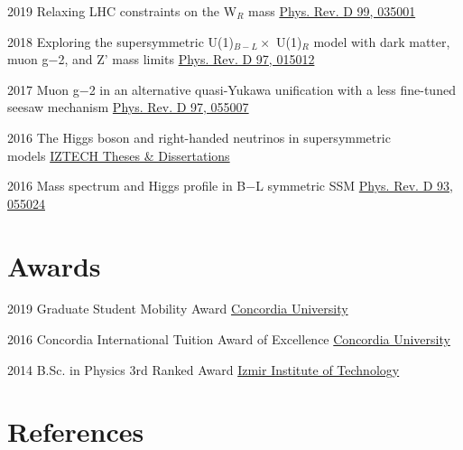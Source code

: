 \documentclass[]{friggeri-cv}
\begin{document}
\begin{entrylist}
	
	\entry
	{2019}
	{Relaxing LHC constraints on the W$_R$ mass}
	{\href{https://journals.aps.org/prd/abstract/10.1103/PhysRevD.99.035001}{Phys. Rev. D 99, 035001}} 
	
	
	\entry
	{2018}
	{Exploring the supersymmetric U(1)$_{B-L} \times$ U(1)$_R$ model with dark matter, muon g−2, and Z' mass limits}
	{\href{https://journals.aps.org/prd/abstract/10.1103/PhysRevD.97.015012}{Phys. Rev. D 97, 015012}} 
	
	\entry
	{2017}
	{Muon g−2 in an alternative quasi-Yukawa unification with a less fine-tuned seesaw mechanism}
	{\href{http://journals.aps.org/prd/abstract/10.1103/PhysRevD.97.055007}{Phys. Rev. D 97, 055007}} 
	
	\entry
	{2016}
	{The Higgs boson and right-handed neutrinos in supersymmetric \\ models}
	{\href{http://openaccess.iyte.edu.tr/xmlui/handle/11147/2842}{IZTECH Theses \& Dissertations}} 
	
	\entry
	{2016}
	{Mass spectrum and Higgs profile in B−L symmetric SSM}
	{\href{http://journals.aps.org/prd/abstract/10.1103/PhysRevD.93.055024}{Phys. Rev. D 93, 055024}} 
	
\end{entrylist}

\section{Awards}

\begin{entrylist}
	
\entry
{2019}
{Graduate Student Mobility Award}
{\href{https://www.concordia.ca/students/exchanges/funding/graduate-mobility-award.html}{Concordia University}} 	


\entry
{2016}
{Concordia International Tuition Award of Excellence}
{\href{http://www.concordia.ca}{Concordia University}} 	


\entry
{2014}
{B.Sc. in Physics 3rd Ranked Award}
{\href{http://www.iyte.edu.tr/AnaSayfa.aspx?d=ENG}{Izmir Institute of Technology}} 	
	
	
\end{entrylist}	
	


\section{References}
	
\end{document}
